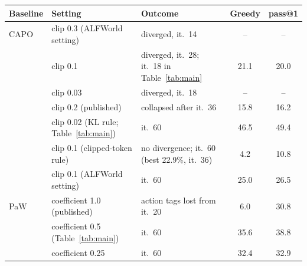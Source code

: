 \begin{tabular}{l l l c c}
\toprule
Baseline & Setting & Outcome & Greedy & pass@1 \\
\midrule
CAPO & clip 0.3 (ALFWorld setting) & diverged, it.~14 & -- & -- \\
 & clip 0.1 & diverged, it.~28; it.~18 in Table~\ref{tab:main} & 21.1 & 20.0 \\
 & clip 0.03 & diverged, it.~18 & -- & -- \\
\sopo{} & clip 0.2 (published) & collapsed after it.~36 & 15.8 & 16.2 \\
 & clip 0.02 (KL rule; Table~\ref{tab:main}) & it.~60 & 46.5 & 49.4 \\
 & clip 0.1 (clipped-token rule) & no divergence; it.~60 (best 22.9\%, it.~36) & 4.2 & 10.8 \\
\steppo{} & clip 0.1 (ALFWorld setting) & it.~60 & 25.0 & 26.5 \\
PaW & coefficient 1.0 (published) & action tags lost from it.~20 & 6.0 & 30.8 \\
 & coefficient 0.5 (Table~\ref{tab:main}) & it.~60 & 35.6 & 38.8 \\
 & coefficient 0.25 & it.~60 & 32.4 & 32.9 \\
\bottomrule
\end{tabular}
